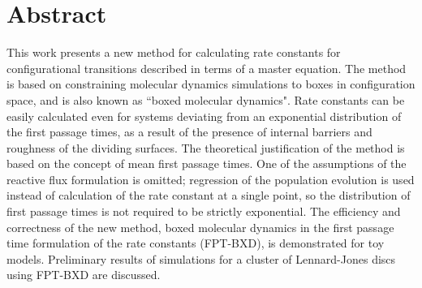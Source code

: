 \chapter*{Abstract}

% 
This work presents a new method for calculating rate constants for configurational transitions described in terms of a master equation.
The method is based on constraining molecular dynamics simulations to boxes in configuration space, and is also known as ``boxed molecular dynamics".
Rate constants can be easily calculated even for systems deviating from an exponential distribution of the first passage times, as a result of the presence of internal barriers and roughness of the dividing surfaces.
The theoretical justification of the method is based on the concept of mean first passage times.
One of the assumptions of the reactive flux formulation is omitted; regression of the population evolution is used instead of calculation of the rate constant at a single point, so the distribution of first passage times is not required to be strictly exponential.
The efficiency and correctness of the new method, boxed molecular dynamics in the first passage time formulation of the rate constants (FPT-BXD), is demonstrated for toy models.
Preliminary results of simulations for a cluster of Lennard-Jones discs using FPT-BXD are discussed.
